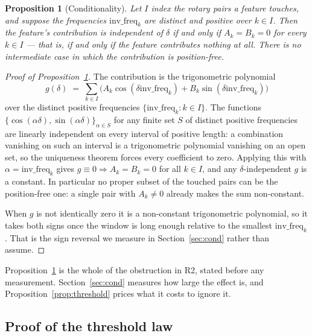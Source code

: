 \documentclass{article}
\theoremstyle{plain}
\newtheorem{proposition}[theorem]{Proposition}
\theoremstyle{remark}
\newcommand{\invf}{\mathrm{inv\_freq}}
\newcommand{\Ak}{A_k}
\newcommand{\Bk}{B_k}
\begin{document}
\begin{proposition}[Conditionality]
\label{prop:cond}
Let $I$ index the rotary pairs a feature touches, and suppose the frequencies
$\invf_k$ are distinct and positive over $k \in I$. Then the feature's
contribution is independent of $\delta$ if and only if $\Ak = \Bk = 0$ for every
$k \in I$ --- that is, if and only if the feature contributes nothing at all.
There is no intermediate case in which the contribution is position-free.
\end{proposition}

\begin{proof}[Proof of Proposition~\ref{prop:cond}]
The contribution is the trigonometric polynomial
\[
  g(\delta) \;=\; \sum_{k \in I} \bigl(\Ak\cos(\delta\invf_k)
    + \Bk\sin(\delta\invf_k)\bigr)
\]
over the distinct positive frequencies $\{\invf_k : k \in I\}$. The functions
$\{\cos(\alpha\delta), \sin(\alpha\delta)\}_{\alpha \in S}$ for any finite set $S$
of distinct positive frequencies are linearly independent on every interval of
positive length: a combination vanishing on such an interval is a trigonometric
polynomial vanishing on an open set, so the uniqueness theorem forces every
coefficient to zero. Applying this with $\alpha = \invf_k$ gives
$g \equiv 0 \Rightarrow \Ak = \Bk = 0$ for all $k \in I$, and any
$\delta$-independent $g$ is a constant. In particular no proper subset of the
touched pairs can be the position-free one: a single pair with $\Ak \ne 0$ already
makes the sum non-constant.

When $g$ is not identically zero it is a non-constant trigonometric polynomial, so
it takes both signs once the window is long enough relative to the smallest
$\invf_k$. That is the sign reversal we measure in Section~\ref{sec:cond} rather
than assume.
\end{proof}

Proposition~\ref{prop:cond} is the whole of the obstruction in R2, stated before
any measurement. Section~\ref{sec:cond} measures how large the effect is, and
Proposition~\ref{prop:threshold} prices what it costs to ignore it.

\subsection{Proof of the threshold law}
\label{app:threshold}
\end{document}
